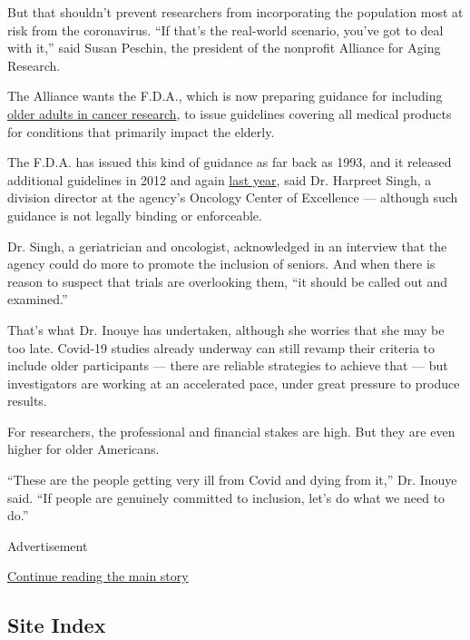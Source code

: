 But that shouldn't prevent researchers from incorporating the population
most at risk from the coronavirus. ``If that's the real-world scenario,
you've got to deal with it,'' said Susan Peschin, the president of the
nonprofit Alliance for Aging Research.

The Alliance wants the F.D.A., which is now preparing guidance for
including
\href{https://www.fda.gov/regulatory-information/search-fda-guidance-documents/inclusion-older-adults-cancer-clinical-trials}{older
adults in cancer research}, to issue guidelines covering all medical
products for conditions that primarily impact the elderly.

The F.D.A. has issued this kind of guidance as far back as 1993, and it
released additional guidelines in 2012 and again
\href{https://www.fda.gov/regulatory-information/search-fda-guidance-documents/enhancing-diversity-clinical-trial-populations-eligibility-criteria-enrollment-practices-and-trial}{last
year}, said Dr. Harpreet Singh, a division director at the agency's
Oncology Center of Excellence --- although such guidance is not legally
binding or enforceable.

Dr. Singh, a geriatrician and oncologist, acknowledged in an interview
that the agency could do more to promote the inclusion of seniors. And
when there is reason to suspect that trials are overlooking them, ``it
should be called out and examined.''

That's what Dr. Inouye has undertaken, although she worries that she may
be too late. Covid-19 studies already underway can still revamp their
criteria to include older participants --- there are reliable strategies
to achieve that --- but investigators are working at an accelerated
pace, under great pressure to produce results.

For researchers, the professional and financial stakes are high. But
they are even higher for older Americans.

``These are the people getting very ill from Covid and dying from it,''
Dr. Inouye said. ``If people are genuinely committed to inclusion, let's
do what we need to do.''

Advertisement

\protect\hyperlink{after-bottom}{Continue reading the main story}

\hypertarget{site-index}{%
\subsection{Site Index}\label{site-index}}

